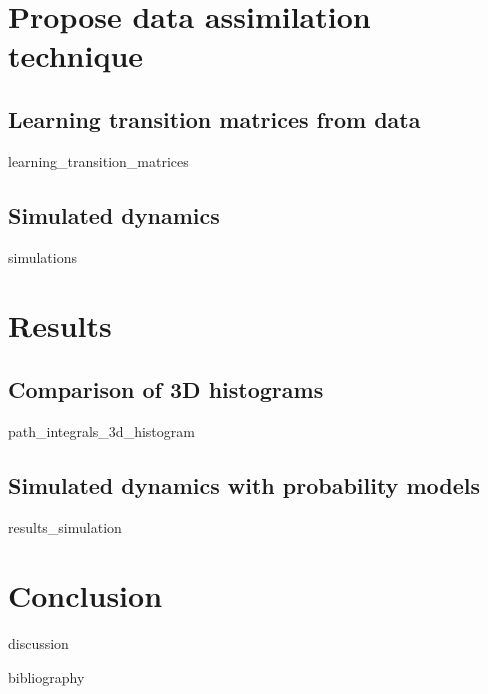 \documentclass[10pt,a4paper]{report}
\begin{document}

\chapter{Propose data assimilation technique}

\FloatBarrier
\section{Learning transition matrices from data}
	{learning_transition_matrices}

\FloatBarrier
\section{Simulated dynamics}
	{simulations}

\FloatBarrier



\chapter{Results}

\FloatBarrier
\section{Comparison of 3D histograms}
	{path_integrals_3d_histogram}

\FloatBarrier
\section{Simulated dynamics with probability models}
	{results_simulation}



\chapter{Conclusion}

\FloatBarrier
	{discussion}




\FloatBarrier


{bibliography}
\end{document}

